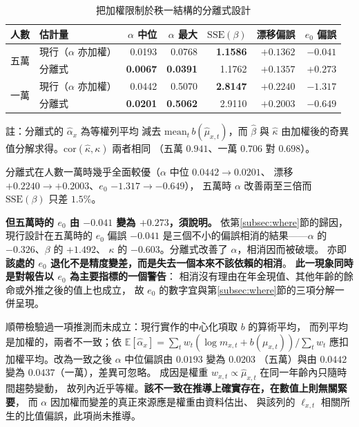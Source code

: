 \documentclass[UTF8, fontset=macnew, a4paper, 12pt]{ctexart}
\newcommand{\Ex}{\mathbb{E}}
\begin{document}
\begin{table}[H]
\centering
\caption{把加權限制於秩一結構的分離式設計}
\small
\renewcommand{\arraystretch}{1.1}
\begin{tabular}{llrrrrr}
\toprule
人數 & 估計量 & $\alpha$ 中位 & $\alpha$ 最大 & $\mathrm{SSE}(\beta)$
& 漂移偏誤 & $e_0$ 偏誤\\
\midrule
\multirow{2}{*}{五萬}
 & 現行（$\alpha$ 亦加權） & 0.0193 & 0.0768 & \textbf{1.1586} & $+0.1362$ & $\mathbf{-0.041}$\\
 & 分離式 & \textbf{0.0067} & \textbf{0.0391} & 1.1762 & $\mathbf{+0.1357}$ & $+0.273$\\
\midrule
\multirow{2}{*}{一萬}
 & 現行（$\alpha$ 亦加權） & 0.0442 & 0.5070 & \textbf{2.8147} & $+0.2240$ & $-1.317$\\
 & 分離式 & \textbf{0.0201} & \textbf{0.5062} & 2.9110 & $\mathbf{+0.2003}$ & $\mathbf{-0.649}$\\
\bottomrule
\end{tabular}

\vspace{2pt}
\parbox{0.92\textwidth}{\footnotesize 註：分離式的 $\hat\alpha_x$ 為等權列平均
減去 $\mathrm{mean}_t\,b(\hat\mu_{x,t})$，而 $\hat\beta$ 與 $\hat\kappa$
由加權後的奇異值分解求得。$\mathrm{cor}(\hat\kappa,\kappa)$ 兩者相同
（五萬 $0.941$、一萬 $0.706$ 對 $0.698$）。}
\label{tab:split}
\end{table}

分離式在人數一萬時幾乎全面較優（$\alpha$ 中位 $0.0442\to0.0201$、
漂移 $+0.2240\to+0.2003$、$e_0$ $-1.317\to-0.649$），
五萬時 $\alpha$ 改善兩至三倍而 $\mathrm{SSE}(\beta)$ 只差 $1.5\%$。

\textbf{但五萬時的 $e_0$ 由 $-0.041$ 變為 $+0.273$，須說明。}
依第\ref{subsec:where}節的歸因，現行設計在五萬時的 $e_0$ 偏誤 $-0.041$
是三個不小的偏誤相消的結果——$\alpha$ 的 $-0.326$、$\beta$ 的 $+1.492$、
$\kappa$ 的 $-0.603$。分離式改善了 $\alpha$，相消因而被破壞。
亦即\textbf{該處的 $e_0$ 退化不是精度變差，而是失去一個本來不該依賴的相消}。
\textbf{此一現象同時是對報告以 $e_0$ 為主要指標的一個警告}：
相消沒有理由在年金現值、其他年齡的餘命或外推之後的值上也成立，
故 $e_0$ 的數字宜與第\ref{subsec:where}節的三項分解一併呈現。

順帶檢驗過一項推測而未成立：現行實作的中心化項取 $b$ 的算術平均，
而列平均是加權的，兩者不一致；依
$\Ex[\hat\alpha_x]=\sum_t w_t(\log m_{x,t}+b(\mu_{x,t}))/\sum_t w_t$
應扣加權平均。改為一致之後 $\alpha$ 中位偏誤由 $0.0193$ 變為 $0.0203$
（五萬）與由 $0.0442$ 變為 $0.0437$（一萬），差異可忽略。
成因是權重 $w_{x,t}\propto\hat\mu_{x,t}$ 在同一年齡內只隨時間趨勢變動，
故列內近乎等權。\textbf{該不一致在推導上確實存在，在數值上則無關緊要}，
而 $\alpha$ 因加權而變差的真正來源應是權重由資料估出、
與該列的 $\ell_{x,t}$ 相關所生的比值偏誤，此項尚未推導。
\end{document}
